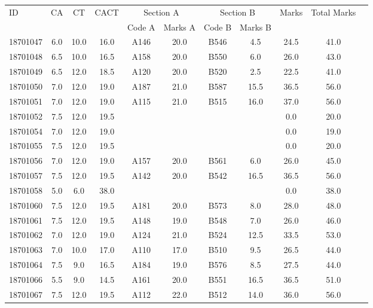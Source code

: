 \documentclass[12pt]{article}
\begin{document}
    \begin{center} 
	\renewcommand{\arraystretch}{1.08}
	\begin{small}
    \begin{tabular}{|l|c|c|c|c|c|c|c|c|c|c|} \hline
	\multirow{2}{*}{ID} & 	\multirow{2}{*}{CA}  & 	\multirow{2}{*}{CT}  & 	\multirow{2}{*}{CACT}  & \multicolumn{2 }{c|}{Section A}& \multicolumn{2 }{c|}{Section B} & 	\multirow{2}{*}{Marks}  & 	\multirow{2}{*}{Total Marks}  \\ 
	&  &  &  & Code A & Marks A & Code B & Marks B&  &  \\ \hline
18701047 & 6.0 & 10.0 & 16.0 & A146 & 20.0 & B546 & 4.5 & 24.5 & 41.0\\ \hline 
18701048 & 6.5 & 10.0 & 16.5 & A158 & 20.0 & B550 & 6.0 & 26.0 & 43.0\\ \hline 
18701049 & 6.5 & 12.0 & 18.5 & A120 & 20.0 & B520 & 2.5 & 22.5 & 41.0\\ \hline 
18701050 & 7.0 & 12.0 & 19.0 & A187 & 21.0 & B587 & 15.5 & 36.5 & 56.0\\ \hline 
18701051 & 7.0 & 12.0 & 19.0 & A115 & 21.0 & B515 & 16.0 & 37.0 & 56.0\\ \hline 
18701052 & 7.5 & 12.0 & 19.5 &  &  &  &  & 0.0 & 20.0\\ \hline 
18701054 & 7.0 & 12.0 & 19.0 &  &  &  &  & 0.0 & 19.0\\ \hline 
18701055 & 7.5 & 12.0 & 19.5 &  &  &  &  & 0.0 & 20.0\\ \hline 
18701056 & 7.0 & 12.0 & 19.0 & A157 & 20.0 & B561 & 6.0 & 26.0 & 45.0\\ \hline 
18701057 & 7.5 & 12.0 & 19.5 & A142 & 20.0 & B542 & 16.5 & 36.5 & 56.0\\ \hline 
18701058 & 5.0 & 6.0 & 38.0 &  &  &  &  & 0.0 & 38.0\\ \hline 
18701060 & 7.5 & 12.0 & 19.5 & A181 & 20.0 & B573 & 8.0 & 28.0 & 48.0\\ \hline 
18701061 & 7.5 & 12.0 & 19.5 & A148 & 19.0 & B548 & 7.0 & 26.0 & 46.0\\ \hline 
18701062 & 7.0 & 12.0 & 19.0 & A124 & 21.0 & B524 & 12.5 & 33.5 & 53.0\\ \hline 
18701063 & 7.0 & 10.0 & 17.0 & A110 & 17.0 & B510 & 9.5 & 26.5 & 44.0\\ \hline 
18701064 & 7.5 & 9.0 & 16.5 & A184 & 19.0 & B576 & 8.5 & 27.5 & 44.0\\ \hline 
18701066 & 5.5 & 9.0 & 14.5 & A161 & 20.0 & B551 & 16.5 & 36.5 & 51.0\\ \hline 
18701067 & 7.5 & 12.0 & 19.5 & A112 & 22.0 & B512 & 14.0 & 36.0 & 56.0\\ \hline 

\end{tabular}
\end{small}
\end{center}
\end{document}
